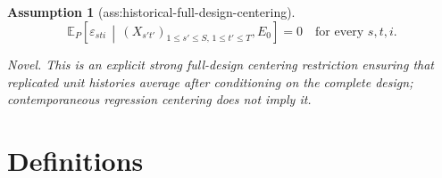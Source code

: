 \documentclass{article}
\newtheorem{assumption}{Assumption}
\begin{document}
\begin{assumption}[ass:historical-full-design-centering]\label{ass:historical-full-design-centering}
\[
\mathbb E_P\!\left[
\varepsilon_{sti}\,\middle|\,
(X_{s't'})_{1\le s'\le S,\,1\le t'\le T},E_0
\right]=0
\quad\text{for every }s,t,i.
\]
\par\smallskip\noindent\emph{Novel.} This is an explicit strong full-design centering restriction ensuring that replicated unit histories average after conditioning on the complete design; contemporaneous regression centering does not imply it.
\end{assumption}

\section{Definitions}
\end{document}
